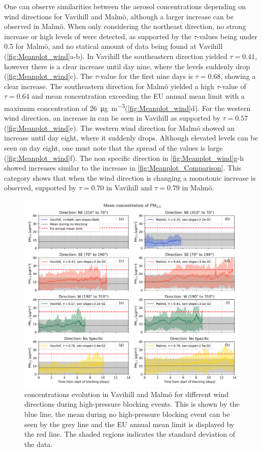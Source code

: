 One can observe similarities between the aerosol concentrations depending on wind directions for Vavihill and Malmö, although a larger increase can be observed in Malmö. When only considering the northeast direction, no strong increase or high levels of \PM were detected, as supported by the $\tau$-values being under 0.5 for Malmö, and no statical amount of data being found at Vavihill (\autoref{fig:Meanplot_wind}a-b). In Vavihill the southeastern direction yielded $\tau=0.41$, however there is a clear increase until day nine, where the levels suddenly drop (\autoref{fig:Meanplot_wind}c). The $\tau$-value for the first nine days is $\tau=0.68$, showing a clear increase. The southeastern direction for Malmö yielded a high $\tau$-value of $\tau=0.64$ and mean concentration exceeding the EU annual mean limit with a maximum concentration of \SI{26}{\micro\gram\per\meter\cubed}(\autoref{fig:Meanplot_wind}d). For the western wind direction, an increase in \PM can be seen in Vavihill as supported by $\tau=0.57$ (\autoref{fig:Meanplot_wind}e). The western wind direction for Malmö showed an increase until day eight, where it suddenly drops. Although elevated levels can be seen on day eight, one must note that the spread of the values is large (\autoref{fig:Meanplot_wind}f). The non specific direction in \autoref{fig:Meanplot_wind}g-h showed increases similar to the increase in \autoref{fig:Meanplot_Comparison}. This category shows that when the wind direction is changing a monotonic increase is observed, supported by $\tau=0.70$ in Vavihill and $\tau=0.79$ in Malmö. 

\begin{figure}[H]
    \centering
    \includegraphics[width=\textwidth]{Figures/Meanplot_dir.png}
    \caption{\PM concentrations evolution in Vavihill and Malmö for different wind directions during high-pressure blocking events. This is shown by the blue line, the mean during no high-pressure blocking event can be seen by the grey line and the EU annual mean limit is displayed by the red line. The shaded regions indicates the standard deviation of the data.}
    \label{fig:Meanplot_wind}
\end{figure}

